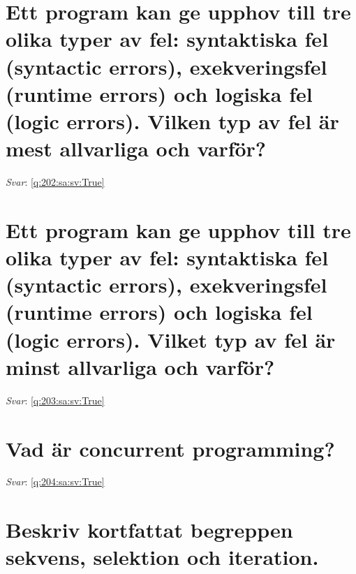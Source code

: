 \documentclass[a4paper,11pt,oneside]{book}
\begin{document}
\begin{sloppypar}
\section{Ett program kan ge upphov till tre olika typer av fel: syntaktiska fel (syntactic errors), exekveringsfel (runtime errors) och logiska fel (logic errors). Vilken typ av fel \"ar mest allvarliga och varf\"or?}

\label{q:202:sa:sv:False}

\vspace{2cm}

\noindent\makebox[\textwidth]{\hrulefill}

\vspace{1cm}

\textit{Svar}: \autoref{q:202:sa:sv:True}



\section{Ett program kan ge upphov till tre olika typer av fel: syntaktiska fel (syntactic errors), exekveringsfel (runtime errors) och logiska fel (logic errors). Vilket typ av fel \"ar minst allvarliga och varf\"or?}

\label{q:203:sa:sv:False}

\vspace{2cm}

\noindent\makebox[\textwidth]{\hrulefill}

\vspace{1cm}

\textit{Svar}: \autoref{q:203:sa:sv:True}



\section{Vad \"ar concurrent programming?}

\label{q:204:sa:sv:False}

\vspace{2cm}

\noindent\makebox[\textwidth]{\hrulefill}

\vspace{1cm}

\textit{Svar}: \autoref{q:204:sa:sv:True}



\section{Beskriv kortfattat begreppen sekvens, selektion och iteration.}


\end{sloppypar}
\end{document}
